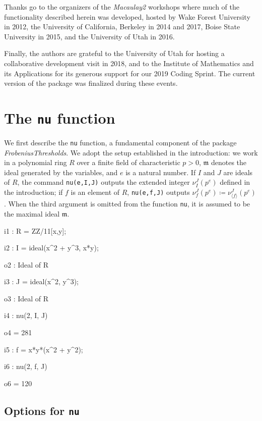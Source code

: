 \documentclass{amsart}
\newcommand{\idealm}{\mathfrak{m}}
\begin{document}
Thanks go to the organizers of the \emph{Macaulay2} workshops where much of the functionality described herein was developed, hosted by Wake Forest University in 2012, the University of California, Berkeley in 2014 and 2017, Boise State University in 2015, and the University of Utah in 2016.

Finally, the authors are grateful to the University of Utah for hosting a collaborative development visit in 2018, and to the Institute of Mathematics and its Applications for its generous support for our 2019 Coding Sprint.
The current version of the package was finalized during these events.

\section{The {\tt nu} function}
\label{sec.Nu}

We first describe the \texttt{nu} function, a fundamental component of the package \emph{FrobeniusThresholds}.
We adopt the setup established in the introduction: we work in a polynomial ring $R$ over a finite field of characteristic $p>0$,  $\idealm$ denotes the ideal generated by the variables, and $e$ is a natural number.
If $I$ and $J$ are ideals of $R$, the command \texttt{nu(e,I,J)} outputs the extended integer $\nu_I^J(p^e)$ defined in the introduction; if $f$ is an element of $R$, \texttt{nu(e,f,J)} outputs $\nu_f^J(p^e) \coloneqq \nu_{\langle f \rangle}^J(p^e)$.
When the third argument is omitted from the function \texttt{nu}, it is assumed to be the maximal ideal $\idealm$.

\smallskip
{\small
{}
\begin{MyVerbatim}
i1 : R = ZZ/11[x,y];

i2 : I = ideal(x^2 + y^3, x*y);

o2 : Ideal of R

i3 : J = ideal(x^2, y^3);

o3 : Ideal of R

i4 : nu(2, I, J)

o4 = 281

i5 : f = x*y*(x^2 + y^2);

i6 : nu(2, f, J)

o6 = 120
\end{MyVerbatim}
}

\subsection{Options for \texttt{nu}}
\end{document}
